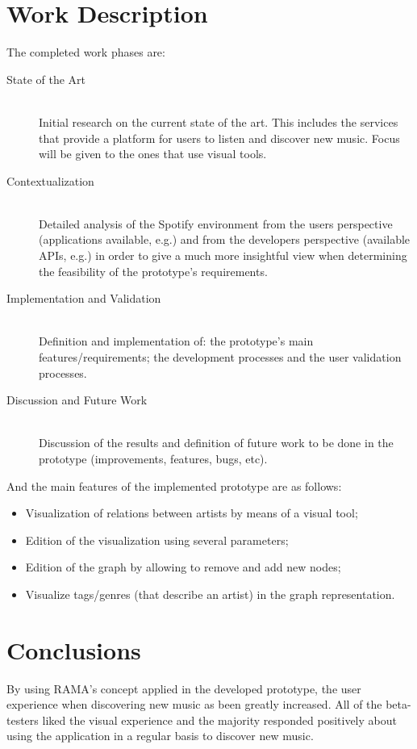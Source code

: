 \documentclass[twocolumn]{article}
\begin{document}
\section{Work Description}
\label{sec:work}
  
  The completed work phases are:

  \begin{description}
    \item[State of the Art] \hfill \\
      Initial research on the current state of the art. 
      This includes the services that provide a platform for users to listen and discover new music. 
      Focus will be given to the ones that use visual tools.
    \item[Contextualization] \hfill \\
      Detailed analysis of the Spotify environment from the users perspective (applications available, e.g.) and from the developers perspective (available APIs, e.g.) in order to give a much more insightful view when determining the feasibility of the prototype's requirements.
    \item[Implementation and Validation] \hfill \\
      Definition and implementation of: the prototype's main features/requirements; the development processes and the user validation processes.
    \item[Discussion and Future Work] \hfill \\
      Discussion of the results and definition of future work to be done in the prototype (improvements, features, bugs, etc).
  \end{description}

  And the main features of the implemented prototype are as follows:

  \begin{itemize}
    \item Visualization of relations between artists by means of a visual tool;
    \item Edition of the visualization using several parameters;
    \item Edition of the graph by allowing to remove and add new nodes;
    \item Visualize tags/genres (that describe an artist) in the graph representation.
  \end{itemize}


\section{Conclusions}
\label{sec:conclusions}

  By using RAMA's concept applied in the developed prototype, the user experience when discovering new music as been greatly increased.
  All of the beta-testers liked the visual experience and the majority responded positively about using the application in a regular basis to discover new music.



\end{document}
